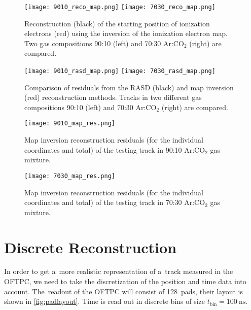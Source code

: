 			\begin{figure}
				\centering
				\texttt{[image: 9010\_reco\_map.png]}
				\hfill
				\texttt{[image: 7030\_reco\_map.png]}
				\caption{Reconstruction (black) of the starting position of ionization electrons (red) using the inversion of the ionization electron map. Two gas compositions 90:10 (left) and 70:30 Ar:CO$_2$ (right) are compared.}
				\label{fig:reco_map}
			\end{figure}
			
			\begin{figure}
				\centering
				\texttt{[image: 9010\_rasd\_map.png]}
				\hfill
				\texttt{[image: 7030\_rasd\_map.png]}
				\caption{Comparison of residuals from the \ac{RASD} (black) and map inversion (red) reconstruction methods. Tracks in two different gas compositions 90:10 (left) and 70:30 Ar:CO$_2$ (right) are compared.}
				\label{fig:rasd_map}
			\end{figure}
			
			\begin{figure}
				\centering
				\texttt{[image: 9010\_map\_res.png]}
				\caption{Map inversion reconstruction residuals (for the individual coordinates and total) of the testing track in 90:10 Ar:CO$_2$ gas mixture.}
				\label{fig:9010_map_res}
			\end{figure}
			
			\begin{figure}
				\centering
				\texttt{[image: 7030\_map\_res.png]}
				\caption{Map inversion reconstruction residuals (for the individual coordinates and total) of the testing track in 70:30 Ar:CO$_2$ gas mixture.}
				\label{fig:7030_map_res}
			\end{figure}
			
			
		
	\section{Discrete Reconstruction}
		
		
		In order to get a~more realistic representation of a~track measured in the \ac{OFTPC}, we need to take the discretization of the position and time data into account. The~readout of the \ac{OFTPC} will consist of 128~pads, their layout is shown in \cref{fig:padlayout}. Time is read out in discrete bins of size $t_\text{bin} = \qty{100}{\ns}$.
		
